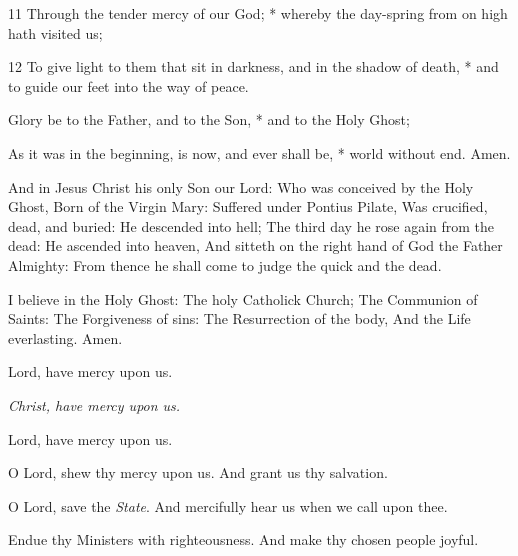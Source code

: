 11 Through the tender mercy of our God; * whereby the day-spring from on high hath visited us;

12 To give light to them that sit in darkness, and in the shadow of death, * and to guide our feet into the way of peace.

Glory be to the Father, and to the Son, * and to the Holy Ghost;

As it was in the beginning, is now, and ever shall be, * world without end. Amen.

\bigskip
{}


And in Jesus Christ his only Son our Lord: Who was conceived by the Holy Ghost, Born of the Virgin Mary: Suffered under Pontius Pilate, Was crucified, dead, and buried: He descended into hell; The third day he rose again from the dead: He ascended into heaven, And sitteth on the right hand of God the Father Almighty: From thence he shall come to judge the quick and the dead.

I believe in the Holy Ghost: The holy Catholick Church; The Communion of Saints: The Forgiveness of sins: The Resurrection of the body, And the Life everlasting. Amen.


\bigskip
{}

\centerline{Lord, have mercy upon us.}
\centerline{\emph{Christ, have mercy upon us.}}
\centerline{Lord, have mercy upon us.}



\V O Lord, shew thy mercy upon us.  \R And grant us thy salvation.

\V O Lord, save the \emph{State}.  \R And mercifully hear us when we call upon thee.

\V Endue thy Ministers with righteousness.  \R And make thy chosen people joyful.

